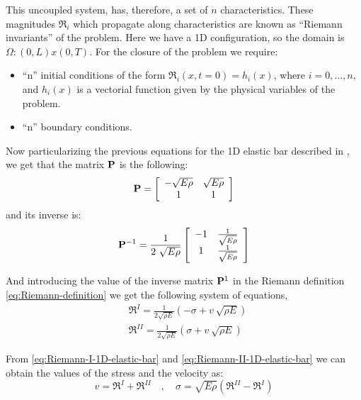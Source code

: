 This uncoupled system, has, therefore, a set of $n$ characteristics.
These magnitudes $\Re_i$ which propagate along characteristics are
known as ``Riemann invariants'' of the problem. Here we have a 1D
configuration, so the domain is $\Omega : \left(0, L\right) x \left(0,
  T\right)$. For the closure of the problem we require:
\begin{itemize}
\item ``n'' initial conditions of the form $\Re_i (x,t=0) = h_i(x)$,
  where $i = {0, \ldots, n}$, and $h_i(x)$ is a vectorial function
  given by the physical variables of the problem.
\item ``n'' boundary conditions.
\end{itemize}

Now particularizing the previous equations for the 1D elastic bar
described in \cite{Dyka1995}, we get that the matrix $\mathbf{{P}}$
is the following:
\begin{equation*}
    \mathbf{{P}} =  \left[
    \begin{array}{cc}
      -\sqrt{E\rho} & \sqrt{E\rho}\\
       1 & 1 
    \end{array} \right]
\end{equation*}
and its inverse is:
\begin{equation*}
    \mathbf{{P}}^{-1} = \frac{1}{2\ \sqrt{E\rho}} \left[
    \begin{array}{cc}
      -1 & \frac{1}{\sqrt{E\rho}}\\
      1 & \frac{1}{\sqrt{E\rho}} 
    \end{array} \right]
\end{equation*}

And introducing the value of the inverse matrix $\mathbf{{P}}^1$ in the
Riemann definition \eqref{eq:Riemann-definition} we get the following
system of equations,
\begin{align}
  \label{eq:Riemann-I-1D-elastic-bar}
  &\Re^{I} = \frac{1}{2\sqrt{\rho E}}\left(-\sigma + v\ \sqrt{\rho E}
    \right)\\
  \label{eq:Riemann-II-1D-elastic-bar}
  &\Re^{II} = \frac{1}{2\sqrt{\rho E}}\left(\sigma + v\ \sqrt{\rho E} \right)
\end{align}

From \eqref{eq:Riemann-I-1D-elastic-bar} and
\eqref{eq:Riemann-II-1D-elastic-bar} we can obtain the values of the
stress and the velocity as:
\begin{equation}
  \label{eq:Riemann-stress-velocity}
  v = \Re^{I} + \Re^{II} \quad , \quad \sigma = \sqrt{E \rho}\left(\Re^{II} - \Re^{I} \right)
\end{equation}

